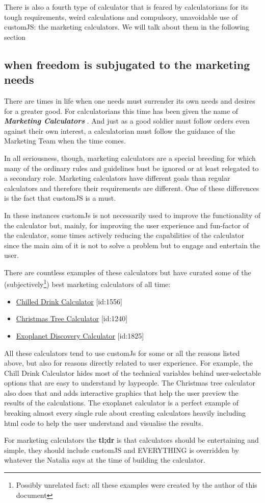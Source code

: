 There is also a fourth type of calculator that is feared by calculatorians for its tough requirements, weird calculations and compulsory, unavoidable use of customJS: the marketing calculators. We will talk about them in the following section

\subsection{when freedom is subjugated to the marketing needs}
\label{sub:marketing}
There are times in life when one needs must surrender its own needs and desires for a greater good. For calculatorians this time has been given the name of \textbf{\textit{Marketing Calculators}} . And just as a good soldier must follow orders even against their own interest, a calculatorian must follow the guidance of the Marketing Team when the time comes. 

In all seriousness, though, marketing calculators are a special breeding for which many of the ordinary rules and guidelines bust be ignored or at least relegated to a secondary role. Marketing calculators have different goals than regular calculators and therefore their requirements are different. One of these differences is the fact that customJS is a must. 

In these instances customJs is not necessarily used to improve the functionality of the calculator but, mainly, for improving the user experience and fun-factor of the calculator, some times actively reducing the capabilities of the calculator since the main aim of it is not to solve a problem but to engage and entertain the user. 

There are countless examples of these calculators but have curated some of the (subjectively\footnote{Possibly unrelated fact: all these examples were created by the author of this document}) best marketing calculators of all time:
\begin{itemize}
    \item \href{https://www.omnicalculator.com/all/chilled-drink}{Chilled Drink Calculator} [id:1556]
    \item \href{https://www.omnicalculator.com/all/christmas-tree}{Christmas Tree Calculator} [id:1240]
    \item \href{https://www.omnicalculator.com/all/exoplanet}{Exoplanet Discovery Calculator} [id:1825]
\end{itemize}

All these calculators tend to use customJs for some or all the reasons listed above, but also for reasons directly related to user experience. For example, the Chill Drink Calculator hides most of the technical variables behind user-selectable options that are easy to understand by laypeople. The Christmas tree calculator also does that and adds interactive graphics that help the user preview the results of the calculations. The exoplanet calculator is a perfect example of breaking almost every single rule about creating calculators heavily including html code to help the user understand and visualise the results.

    For marketing calculators the \large{\textbf{tl;dr}} is that calculators should be entertaining and simple, they should include customJS and EVERYTHING is overridden by whatever the Natalia says at the time of building the calculator.
